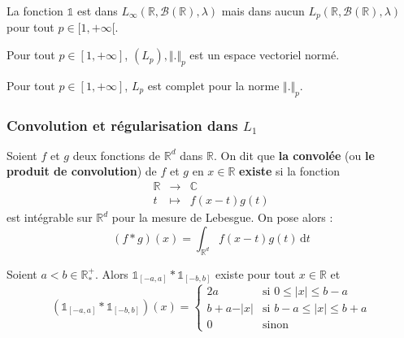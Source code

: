   \begin{cexample}
    La fonction $\mathbb{1}$ est dans $L_\infty(\mathbb{R}, \mathcal{B}(\mathbb{R}), \lambda)$ mais dans aucun $L_p(\mathbb{R}, \mathcal{B}(\mathbb{R}), \lambda)$ pour tout $p \in [1, +\infty[$.
  \end{cexample}

  \begin{theorem}
    Pour tout $p \in [1, +\infty]$, $(L_p), \Vert . \Vert_p$ est un espace vectoriel normé.
  \end{theorem}

  \begin{theorem}
    Pour tout $p \in [1, +\infty]$, $L_p$ est complet pour la norme $\Vert . \Vert_p$.
  \end{theorem}

  \subsubsection{Convolution et régularisation dans \texorpdfstring{$L_1$}{L₁}}


  \begin{definition}
    Soient $f$ et $g$ deux fonctions de $\mathbb{R}^d$ dans $\mathbb{R}$. On dit que \textbf{la convolée} (ou \textbf{le produit de convolution}) de $f$ et $g$ en $x \in \mathbb{R}$ \textbf{existe} si la fonction
    \[
    \begin{array}{ccc}
      \mathbb{R} &\rightarrow& \mathbb{C} \\
      t &\mapsto& f(x-t)g(t)
    \end{array}
    \]
    est intégrable sur $\mathbb{R}^d$ pour la mesure de Lebesgue. On pose alors :
    \[ (f * g)(x) = \int_{\mathbb{R}^d} f(x-t)g(t) \, \mathrm{d}t \]
  \end{definition}

  \begin{example}
    Soient $a < b \in \mathbb{R}^+_*$. Alors $\mathbb{1}_{[-a, a]} * \mathbb{1}_{[-b,b]}$ existe pour tout $x \in \mathbb{R}$ et
    \[ \left( \mathbb{1}_{[-a, a]} * \mathbb{1}_{[-b,b]} \right)(x) =
    \begin{cases}
      2a &\text{si } 0 \leq \vert x \vert \leq b-a \\
      b+a-\vert x \vert &\text{si } b-a \leq \vert x \vert \leq b+a \\
      0 &\text{sinon}
    \end{cases}
    \]
  \end{example}

